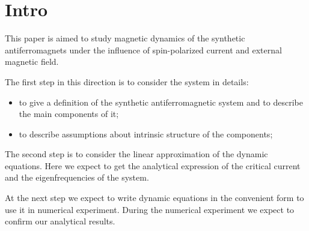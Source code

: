 \section{Intro}

This paper is aimed to study magnetic dynamics of the synthetic antiferromagnets under the influence of spin-polarized current and external magnetic field.

The first step in this direction is to consider the system in details:
\begin{itemize}
\item to give a definition of the synthetic antiferromagnetic system and to describe the main components of it;
\item to describe assumptions about intrinsic structure of the components;
\end{itemize}

The second step is to consider the linear approximation of the dynamic equations. Here we expect to get the analytical expression of the critical current and the eigenfrequencies of the system.

At the next step we expect to write dynamic equations in the convenient form to use it in numerical experiment. During the numerical experiment  we expect to confirm our analytical results.
